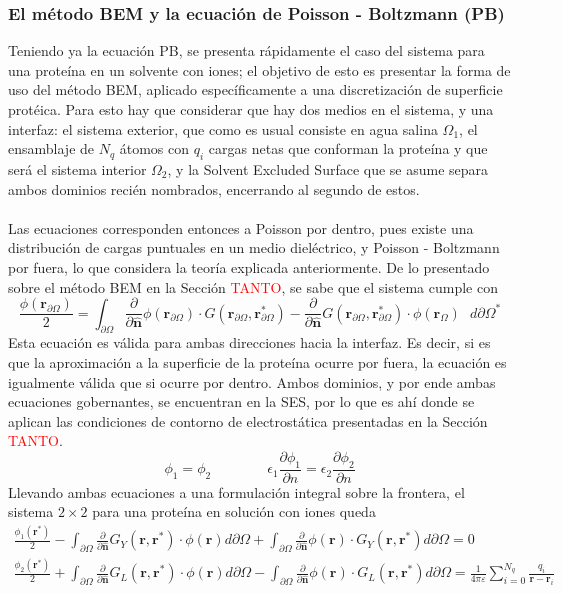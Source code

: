 \documentclass[12pt, notitlepage]{article}
\numberwithin{equation}{section}
\begin{document}
\subsubsection{El método BEM y la ecuación de Poisson - Boltzmann (PB)}
Teniendo ya la ecuación PB, se presenta rápidamente el caso del sistema para una proteína en un solvente con iones; el objetivo de esto es presentar la forma de uso del método BEM, aplicado específicamente a una discretización de superficie protéica. Para esto hay que considerar que hay dos medios en el sistema, y una interfaz: el sistema exterior, que como es usual consiste en agua salina $\Omega_1$, el ensamblaje de $N_q$ átomos con $q_i$ cargas netas que conforman la proteína y que será el sistema interior $\Omega_2$, y la Solvent Excluded Surface que se asume separa ambos dominios recién nombrados, encerrando al segundo de estos.\\\\
Las ecuaciones corresponden entonces a Poisson por dentro, pues existe una distribución de cargas puntuales en un medio dieléctrico, y Poisson - Boltzmann por fuera, lo que considera la teoría explicada anteriormente. De lo presentado sobre el método BEM en la Sección \textcolor{red}{TANTO}, se sabe que el sistema cumple con
\begin{equation}
\frac{\phi(\mathbf{r}_{\partial\Omega})}{2} = \int_{\partial\Omega}\frac{\partial}{\partial\hat{\mathbf{n}}}\phi(\mathbf{r}_{\partial\Omega})\cdot G(\mathbf{r}_{\partial\Omega},\mathbf{r}_{\partial\Omega}^*) - \frac{\partial}{\partial\hat{\mathbf{n}}}G(\mathbf{r}_{\partial\Omega},\mathbf{r}_{\partial\Omega}^*)\cdot\phi(\mathbf{r}_\Omega)\text{ }d\partial\Omega^*
\end{equation}
Esta ecuación es válida para ambas direcciones hacia la interfaz. Es decir, si es que la aproximación a la superficie de la proteína ocurre por fuera, la ecuación es igualmente válida que si ocurre por dentro. Ambos dominios, y por ende ambas ecuaciones gobernantes, se encuentran en la SES, por lo que es ahí donde se aplican las condiciones de contorno de electrostática presentadas en la Sección \textcolor{red}{TANTO}.
\begin{equation}
\phi_1 = \phi_2 \qquad\qquad \epsilon_1\frac{\partial\phi_1}{\partial n} = \epsilon_2\frac{\partial\phi_2}{\partial n}
\end{equation}
Llevando ambas ecuaciones a una formulación integral sobre la frontera, el sistema $2\times2$ para una proteína en solución con iones queda \cite{Cooper2015}
\begin{gather}
\frac{\phi_{1}(\mathbf{r}^*)}{2} - \int_{\partial\Omega}\frac{\partial}{\partial\hat{\mathbf{n}}}G_Y(\mathbf{r},\mathbf{r}^*)\cdot\phi(\mathbf{r})d\partial\Omega + \int_{\partial\Omega}\frac{\partial}{\partial\hat{\mathbf{n}}}\phi(\mathbf{r})\cdot G_Y(\mathbf{r},\mathbf{r}^*)d\partial\Omega = 0\\
\frac{\phi_{2}(\mathbf{r}^*)}{2} + \int_{\partial\Omega}\frac{\partial}{\partial\hat{\mathbf{n}}}G_L(\mathbf{r},\mathbf{r}^*)\cdot\phi(\mathbf{r})d\partial\Omega - \int_{\partial\Omega}\frac{\partial}{\partial\hat{\mathbf{n}}}\phi(\mathbf{r})\cdot G_L(\mathbf{r},\mathbf{r}^*)d\partial\Omega = \frac{1}{4\pi\varepsilon}\sum_{i=0}^{N_q}\frac{q_i}{\mathbf{r} - \mathbf{r}_i}
\end{gather}
\end{document}

